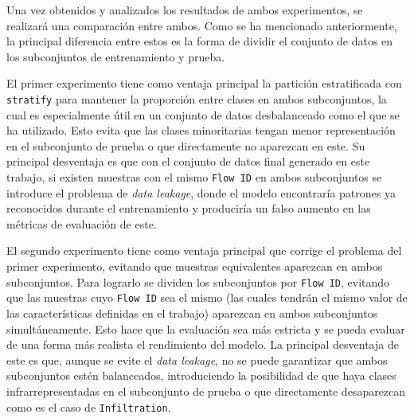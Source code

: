 Una vez obtenidos y analizados los resultados de ambos experimentos, se realizará una comparación entre ambos. Como se ha mencionado anteriormente, la principal diferencia entre estos es la forma de dividir el conjunto de datos en los subconjuntos de entrenamiento y prueba.

El primer experimento tiene como ventaja principal la partición estratificada con \texttt{stratify} para mantener la proporción entre clases en ambos subconjuntos, la cual es especialmente útil en un conjunto de datos desbalanceado como el que se ha utilizado. Esto evita que las clases minoritarias tengan menor representación en el subconjunto de prueba o que directamente no aparezcan en este. Su principal desventaja es que con el conjunto de datos final generado en este trabajo, si existen muestras con el mismo \texttt{Flow ID} en ambos subconjuntos se introduce el problema de \textit{data leakage}, donde el modelo encontraría patrones ya reconocidos durante el entrenamiento y produciría un falso aumento en las métricas de evaluación de este.

El segundo experimento tiene como ventaja principal que corrige el problema del primer experimento, evitando que muestras equivalentes aparezcan en ambos subconjuntos. Para lograrlo se dividen los subconjuntos por \texttt{Flow ID}, evitando que las muestras cuyo \texttt{Flow ID} sea el mismo (las cuales tendrán el mismo valor de las características definidas en el trabajo) aparezcan en ambos subconjuntos simultáneamente. Esto hace que la evaluación sea más estricta y se pueda evaluar de una forma más realista el rendimiento del modelo. La principal desventaja de este es que, aunque se evite el \textit{data leakage}, no se puede garantizar que ambos subconjuntos estén balanceados, introduciendo la posibilidad de que haya clases infrarrepresentadas en el subconjunto de prueba o que directamente desaparezcan como es el caso de \texttt{Infiltration}.


